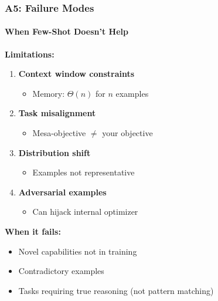 \documentclass[10pt,aspectratio=169]{beamer}
\begin{document}
\begin{frame}
\frametitle{A5: Failure Modes}
\framesubtitle{When Few-Shot Doesn't Help}

\textbf{Limitations:}
\begin{enumerate}
    \item \textbf{Context window constraints}
    \begin{itemize}
        \item Memory: $\Theta(n)$ for $n$ examples
    \end{itemize}
    
    \item \textbf{Task misalignment}
    \begin{itemize}
        \item Mesa-objective $\neq$ your objective
    \end{itemize}
    
    \item \textbf{Distribution shift}
    \begin{itemize}
        \item Examples not representative
    \end{itemize}
    
    \item \textbf{Adversarial examples}
    \begin{itemize}
        \item Can hijack internal optimizer
    \end{itemize}
\end{enumerate}

\vspace{0.5cm}
\textbf{When it fails:}
\begin{itemize}
    \item Novel capabilities not in training
    \item Contradictory examples
    \item Tasks requiring true reasoning (not pattern matching)
\end{itemize}
\end{frame}
\end{document}
